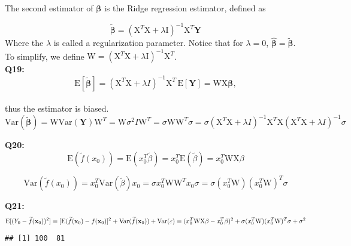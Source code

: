 \documentclass[]{article}
\newenvironment{Shaded}{\begin{snugshade}}{\end{snugshade}}
\newcommand{\KeywordTok}[1]{\textcolor[rgb]{0.13,0.29,0.53}{\textbf{#1}}}
\newcommand{\StringTok}[1]{\textcolor[rgb]{0.31,0.60,0.02}{#1}}
\newcommand{\OperatorTok}[1]{\textcolor[rgb]{0.81,0.36,0.00}{\textbf{#1}}}
\newcommand{\NormalTok}[1]{#1}
\begin{document}
The second estimator of \(\boldsymbol{\beta}\) is the Ridge regression
estimator, defined as

\[\widetilde{\boldsymbol \beta}=(\text{X}^T\text{X}+\lambda \text{I})^{-1}\text{X}^T{\mathbf Y}\]
Where the \(\lambda\) is called a regularization parameter. Notice that
for \(\lambda = 0\),
\(\boldsymbol{\hat{\beta}}=\boldsymbol{\widetilde{\beta}}\). To
simplify, we define
\(\text{W} = (\text{X}^T\text{X}+\lambda \text{I})^{-1}\text{X}^T\).\\
\textbf{Q19:}
\[\text{E}[\boldsymbol{\widetilde{\beta}}] = (\text{X}^T\text{X} + \lambda I)^{-1}\text{X}^T \, \text{E}[\mathbf{Y}] = \text{W}\text{X}\boldsymbol{\beta},\]\\
thus the estimator is biased.\\
\[\text{Var}(\boldsymbol{\widetilde{\beta}}) = \text{W} \text{Var}(\mathbf{Y})\text{W}^T = \text{W} \sigma^2 I \text{W}^T 
= \sigma \text{W}\text{W}^T \sigma = \sigma(\text{X}^T\text{X} + \lambda I)^{-1}\text{X}^T\text{X}(\text{X}^T\text{X}+\lambda I)^{-1}\sigma\]

\textbf{Q20:}
\[\text{E}(\widetilde{f}(x_0)) = \text{E}(x_0^T \widetilde{\beta}) = x_0^T\text{E}(\widetilde{\beta})=x_0^T\text{W}\text{X}\beta\]

\[\text{Var}(\widetilde{f}(x_0)) = x_0^T\text{Var}(\widetilde{\beta})x_0 = \sigma x_0^T \text{W} \text{W}^T x_0 \sigma = \sigma (x_0^T\text{W})(x_0^T\text{W})^T\sigma\]

\textbf{Q21:}
\[\text{E}[(Y_0-\widetilde{f}({\bf x}_0))^2]=[\text{E}(\widetilde{f}({\bf x}_0)-f({\bf x}_0)]^2+\text{Var}(\widetilde{f}({\bf x}_0) ) + \text{Var}(\varepsilon) = (x_0^T\text{W}\text{X}\beta - x_0^T\beta)^2 + \sigma (x_0^T\text{W})(x_0^T\text{W})^T\sigma + \sigma^2\]

\begin{Shaded}
\end{Shaded}

\begin{verbatim}
## [1] 100  81
\end{verbatim}

\begin{Shaded}
\end{Shaded}
\end{document}
